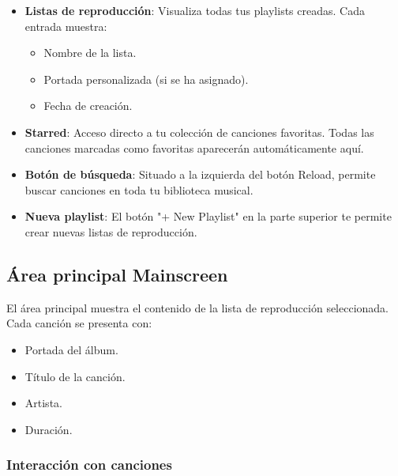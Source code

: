 \documentclass[11pt, a4paper]{article}
\begin{document}
  \begin{itemize}
    \item \textbf{Listas de reproducción}: Visualiza todas tus playlists creadas. Cada entrada muestra:
    \begin{itemize}
      \item Nombre de la lista.
      \item Portada personalizada (si se ha asignado).
      \item Fecha de creación.
    \end{itemize}
      
    \item \textbf{Starred}: Acceso directo a tu colección de canciones favoritas. Todas las canciones marcadas como favoritas aparecerán automáticamente aquí.
      
    \item \textbf{Botón de búsqueda}: Situado a la izquierda del botón Reload, permite buscar canciones en toda tu biblioteca musical.
      
    \item \textbf{Nueva playlist}: El botón "+ New Playlist" en la parte superior te permite crear nuevas listas de reproducción.
  \end{itemize}

  \subsection{Área principal Mainscreen}

  El área principal muestra el contenido de la lista de reproducción seleccionada. Cada canción se presenta con:

  \begin{itemize}
    \item Portada del álbum.
    \item Título de la canción.
    \item Artista.
    \item Duración.
  \end{itemize}

    \subsubsection{Interacción con canciones}
\end{document}
